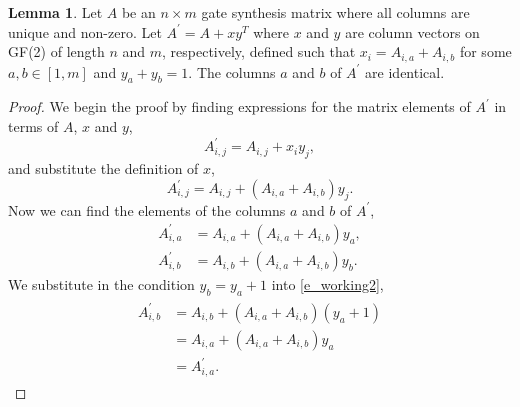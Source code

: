\documentclass{article}
\theoremstyle{definition}
\theoremstyle{problem}
\theoremstyle{lemma}
\newtheorem{lemma}{Lemma}[section]
\begin{document}
		\theoremstyle{lemma}
		\begin{lemma}{}
			\label{lem2}
			Let $A$ be an $n\times m$ gate synthesis matrix where all columns are unique and non-zero. Let $A^\prime = A + xy^T$ where $x$ and $y$ are column vectors on GF(2) of length $n$ and $m$, respectively, defined such that $x_i = A_{i,a} + A_{i,b}$ for some $a,b\in \left[1,m\right]$ and $y_a + y_b = 1$. The columns $a$ and $b$ of $A^\prime$ are identical.
		\end{lemma}
		\begin{proof}
			We begin the proof by finding expressions for the matrix elements of $A^\prime$ in terms of $A$, $x$ and $y$,
			\begin{equation}
			A^\prime_{i,j} = A_{i,j} + x_i y_j,
			\end{equation}
			and substitute the definition of $x$,
			\begin{equation}
			A^\prime_{i,j} = A_{i,j} + (A_{i,a}+A_{i,b}) y_j.
			\end{equation}
			Now we can find the elements of the columns $a$ and $b$ of $A^\prime$,
			\begin{align}
			A^\prime_{i,a} &= A_{i,a} + (A_{i,a}+A_{i,b}) y_a,\\
			A^\prime_{i,b} &= A_{i,b} + (A_{i,a}+A_{i,b}) y_b.
			\label{e_working2}
			\end{align}
			We substitute in the condition $y_b = y_a + 1$ into \ref{e_working2},
			\begin{align}
			\begin{split}
			A^\prime_{i,b} &= A_{i,b} + (A_{i,a}+A_{i,b}) (y_a + 1) \\
			&= A_{i,a} + (A_{i,a}+A_{i,b})y_a \\
			& = A^\prime_{i,a}.
			\end{split}			
			\end{align}
		\end{proof}
		
\end{document}
